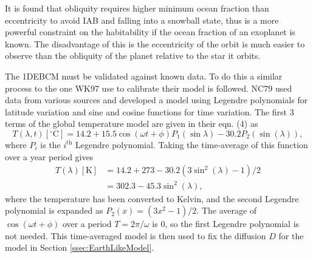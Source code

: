 \documentclass[12pt, onecolumn]{revtex4-2}    %
\newcommand{\degrees}{\ensuremath{^{\circ}}}
\begin{document}
It is found that obliquity requires higher minimum ocean fraction than eccentricity to avoid IAB and falling into a snowball state, thus is a more powerful constraint on the habitability if the ocean fraction of an exoplanet is known. The disadvantage of this is the eccentricity of the orbit is much easier to observe than the obliquity of the planet relative to the star it orbits.

%

The 1DEBCM must be validated against known data.
To do this a similar process to the one WK97 use to calibrate their model is followed.
NC79 used data from various sources and developed a model using Legendre polynomials for latitude variation and sine and cosine functions for time variation.
The first 3 terms of the global temperature model are given in their eqn. (4) as
\begin{equation}
  T(\lambda, t)[\degrees\text{C}] = 14.2 + 15.5 \cos(\omega t + \phi) P_1(\sin\lambda) - 30.2 P_2(\sin(\lambda)),
  \label{eq:NC_timedep}
\end{equation}
where $P_i$ is the $i^\text{th}$ Legendre polynomial.
Taking the time-average of this function over a year period gives
\begin{equation}
  \begin{split}
    T(\lambda)[\text{K}] & = 14.2 + 273 - 30.2 (3 \sin^2(\lambda) - 1) / 2 \\
                         & = 302.3 - 45.3\sin^2(\lambda),
  \end{split}
  \label{eq:NC_timeavg}
\end{equation}
where the temperature has been converted to Kelvin, and the second Legendre polynomial is expanded as $P_2(x) =(3x^2-1) / 2$.
The average of $\cos(\omega t + \phi)$ over a period $T = 2\pi / \omega$ is $0$, so the first Legendre polynomial is not needed.
This time-averaged model is then used to fix the diffusion $D$ for the model in Section \ref{ssec:EarthLikeModel}.

\end{document}
